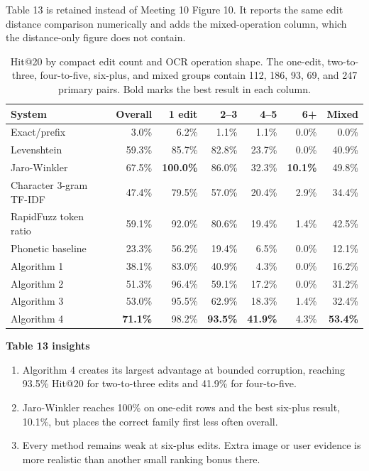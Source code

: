 \documentclass[11pt,a4paper]{article}
\begin{document}
{Table 13 is retained instead of Meeting 10 Figure 10. It reports the same edit
distance comparison numerically and adds the mixed-operation column, which the
distance-only figure does not contain.

\begin{table}[H]
\centering
\footnotesize
\begin{tabular}{@{}lrrrrrr@{}}
\toprule
\textbf{System} & \textbf{Overall} & \textbf{1 edit} & \textbf{2--3} &
\textbf{4--5} & \textbf{6+} & \textbf{Mixed} \\
\midrule
Exact/prefix & 3.0\% & 6.2\% & 1.1\% & 1.1\% & 0.0\% & 0.0\% \\
Levenshtein & 59.3\% & 85.7\% & 82.8\% & 23.7\% & 0.0\% & 40.9\% \\
Jaro-Winkler & 67.5\% & \textbf{100.0\%} & 86.0\% & 32.3\% & \textbf{10.1\%} & 49.8\% \\
Character 3-gram TF-IDF & 47.4\% & 79.5\% & 57.0\% & 20.4\% & 2.9\% & 34.4\% \\
RapidFuzz token ratio & 59.1\% & 92.0\% & 80.6\% & 19.4\% & 1.4\% & 42.5\% \\
Phonetic baseline & 23.3\% & 56.2\% & 19.4\% & 6.5\% & 0.0\% & 12.1\% \\
Algorithm 1 & 38.1\% & 83.0\% & 40.9\% & 4.3\% & 0.0\% & 16.2\% \\
Algorithm 2 & 51.3\% & 96.4\% & 59.1\% & 17.2\% & 0.0\% & 31.2\% \\
Algorithm 3 & 53.0\% & 95.5\% & 62.9\% & 18.3\% & 1.4\% & 32.4\% \\
Algorithm 4 & \textbf{71.1\%} & 98.2\% & \textbf{93.5\%} & \textbf{41.9\%} & 4.3\% & \textbf{53.4\%} \\
\bottomrule
\end{tabular}
\caption{Hit@20 by compact edit count and OCR operation shape. The one-edit,
two-to-three, four-to-five, six-plus, and mixed groups contain 112, 186, 93,
69, and 247 primary pairs. Bold marks the best result in each column.}
\end{table}

\textbf{Table 13 insights}
\begin{enumerate}
  \item Algorithm 4 creates its largest advantage at bounded corruption,
        reaching 93.5\% Hit@20 for two-to-three edits and 41.9\% for four-to-five.
  \item Jaro-Winkler reaches 100\% on one-edit rows and the best six-plus result,
        10.1\%, but places the correct family first less often overall.
  \item Every method remains weak at six-plus edits. Extra image or user
        evidence is more realistic than another small ranking bonus there.
\end{enumerate}
}
\end{document}
